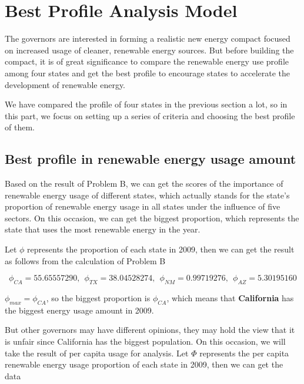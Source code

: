 \documentclass[a4paper,11pt]{article}
\begin{document}
\section{Best Profile Analysis Model}

\par The governors are interested in forming a realistic new energy compact focused on increased usage of cleaner, renewable energy sources. But before building the compact, it is of great significance to compare the renewable energy use profile among four states and get the best profile to encourage states to accelerate the development of renewable energy.

\par We have compared the profile of four states in the previous section a lot, so in this part, we focus on setting up a series of criteria and choosing the best profile of them. 

\subsection{Best profile in renewable energy usage amount}

\par Based on the result of Problem B, we can get the scores of the importance of renewable energy usage of different states, which actually stands for the state's proportion of renewable energy usage in all states under the influence of five sectors. On this occasion, we can get the biggest proportion, which represents the state that uses the most renewable energy in the year.
\par Let $\phi$ represents the proportion of each state in 2009, then we can get the result as follows from the calculation of Problem B

\begin{equation}
    \phi_{CA} = 55.65557290,~~ \phi_{TX} = 38.04528274,~~ \phi_{NM} = 0.99719276,~~ \phi_{AZ} = 5.30195160
\end{equation}

\par $\phi_{max} = \phi_{CA}$, so the biggest proportion is $\phi_{CA}$, which means that \textbf{California} has the biggest energy usage amount in 2009.

\par But other governors may have different opinions, they may hold the view that it is unfair since California has the biggest population. On this occasion, we will take the result of per capita usage for analysis. Let $\Phi$ represents the per capita renewable energy usage proportion of each state in 2009, then we can get the data
\end{document}
